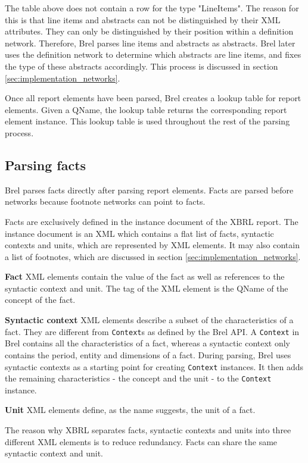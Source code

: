 The table above does not contain a row for the type "LineItems".
The reason for this is that line items and abstracts can not be distinguished by their XML attributes.
They can only be distinguished by their position within a definition network.
Therefore, Brel parses line items and abstracts as abstracts.
Brel later uses the definition network to determine which abstracts are line items, and fixes the type of these abstracts accordingly.
This process is discussed in section \ref{sec:implementation_networks}.

Once all report elements have been parsed, Brel creates a lookup table for report elements.
Given a QName, the lookup table returns the corresponding report element instance.
This lookup table is used throughout the rest of the parsing process.

\subsection{Parsing facts}

Brel parses facts directly after parsing report elements.
Facts are parsed before networks because footnote networks can point to facts.

Facts are exclusively defined in the instance document of the XBRL report.
The instance document is an XML which contains a flat list of facts, syntactic contexts and units, which are represented by XML elements.
It may also contain a list of footnotes, which are discussed in section \ref{sec:implementation_networks}.

\textbf{Fact} XML elements contain the value of the fact as well as references to the syntactic context and unit.
The tag of the XML element is the QName of the concept of the fact. 

\textbf{Syntactic context} XML elements describe a subset of the characteristics of a fact.
They are different from \texttt{Context}s as defined by the Brel API.
A \texttt{Context} in Brel contains all the characteristics of a fact, whereas a syntactic context only contains the period, entity and dimensions of a fact.
During parsing, Brel uses syntactic contexts as a starting point for creating \texttt{Context} instances.
It then adds the remaining characteristics - the concept and the unit - to the \texttt{Context} instance.

\textbf{Unit} XML elements define, as the name suggests, the unit of a fact.

The reason why XBRL separates facts, syntactic contexts and units into three different XML elements is to reduce redundancy.
Facts can share the same syntactic context and unit.

